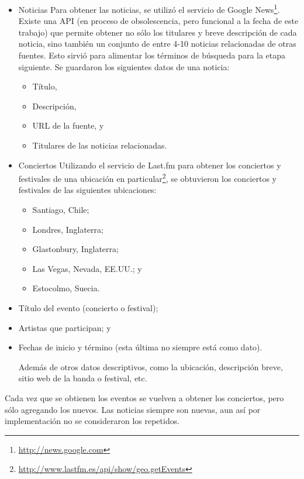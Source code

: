 \begin{itemize}
\item Noticias
  Para obtener las noticias, se utilizó el servicio de Google
  News\footnote{\href{http://news.google.com}{http://news.google.com} }. Existe una API (en proceso de
  obsolescencia, pero funcional a la fecha de este trabajo) que permite
  obtener no sólo los titulares y breve descripción de cada noticia,
  sino también un conjunto de entre 4-10 noticias relacionadas de otras
  fuentes. Esto sirvió para alimentar los términos de búsqueda para la
  etapa siguiente. Se guardaron los siguientes datos de una noticia:

\begin{itemize}
\item Título,
\item Descripción,
\item URL de la fuente, y
\item Titulares de las noticias relacionadas.
\end{itemize}

\item Conciertos
  Utilizando el servicio de Last.fm para obtener los conciertos y
  festivales de una ubicación en
  particular\footnote{\href{http://www.lastfm.es/api/show/geo.getEvents}{http://www.lastfm.es/api/show/geo.getEvents} }, se
  obtuvieron los conciertos y festivales de las siguientes
  ubicaciones:

\begin{itemize}
\item Santiago, Chile;
\item Londres, Inglaterra;
\item Glastonbury, Inglaterra;
\item Las Vegas, Nevada, EE.UU.; y
\item Estocolmo, Suecia.
\end{itemize}

\item Título del evento (concierto o festival);
\item Artistas que participan; y
\item Fechas de inicio y término (esta última no siempre está como
    dato).

  Además de otros datos descriptivos, como la ubicación, descripción
  breve, sitio web de la banda o festival, etc.
\end{itemize}
Cada vez que se obtienen los eventos se vuelven a obtener los
conciertos, pero sólo agregando los nuevos. Las noticias siempre son
nuevas, aun así por implementación no se consideraron los repetidos.

